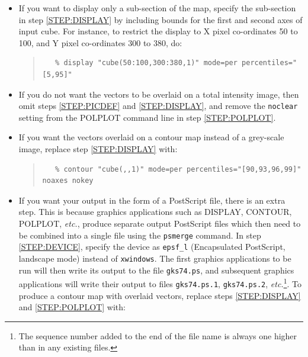 \documentclass[twoside,11pt]{article}
\newcommand{\xref}[3]{#1}
\renewcommand{\_}{\texttt{\symbol{95}}}
\newenvironment{myquote}{\begin{quote}\begin{small}}{\end{small}\end{quote}}
\begin{document}
\begin{itemize}

\item If you want to display only a sub-section of the map, specify the
sub-section in step \ref{STEP:DISPLAY} by including bounds for the
first and second axes of input cube. For instance, to restrict the
display to X pixel co-ordinates 50 to 100, and Y pixel co-ordinates 300 
to 380, do:

\begin{myquote}
\begin{verbatim}
   % display "cube(50:100,300:380,1)" mode=per percentiles="[5,95]"
\end{verbatim}
\end{myquote}

\item If you do not want the vectors to be overlaid on a total
intensity image, then omit steps \ref{STEP:PICDEF} and
\ref{STEP:DISPLAY}, and remove the \verb+noclear+ setting from the
POLPLOT command line in step \ref{STEP:POLPLOT}.

\item If you want the vectors overlaid on a contour map instead of a
grey-scale image, replace step \ref{STEP:DISPLAY} with:

\begin{myquote}
\begin{verbatim}
   % contour "cube(,,1)" mode=per percentiles="[90,93,96,99]" noaxes nokey
\end{verbatim}
\end{myquote}

\item If you want your output in the form of a PostScript file, there is
an extra step. This is because graphics applications such as DISPLAY,
CONTOUR, POLPLOT, \emph{etc.}, produce separate output PostScript files which
then need to be combined into a single file using the 
\xref{\texttt{psmerge}}{sun164}{} command. In step \ref{STEP:DEVICE},
specify the device as \verb+epsf_l+ (Encapsulated PostScript, landscape
mode) instead of \verb+xwindows+. The first graphics applications to be
run will then write its output to the file \verb+gks74.ps+, and
subsequent graphics applications will write their output to files
\verb+gks74.ps.1+, \verb+gks74.ps.2+, \emph{etc.}\footnote{The sequence number
added to the end of the file name is always one higher than in any
existing files.}. To produce a contour map with overlaid vectors, replace
steps \ref{STEP:DISPLAY} and \ref{STEP:POLPLOT} with:


\end{itemize}
\end{document}
